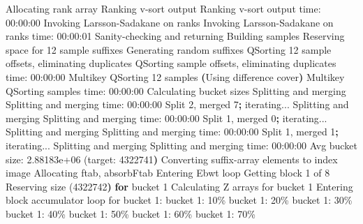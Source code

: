 \documentclass[
  letterpaper,
  DIV=11,
  numbers=noendperiod]{scrartcl}
\newenvironment{Shaded}{\begin{snugshade}}{\end{snugshade}}
\newcommand{\ControlFlowTok}[1]{\textcolor[rgb]{0.00,0.23,0.31}{\textbf{#1}}}
\newcommand{\ErrorTok}[1]{\textcolor[rgb]{0.68,0.00,0.00}{#1}}
\newcommand{\ExtensionTok}[1]{\textcolor[rgb]{0.00,0.23,0.31}{#1}}
\newcommand{\KeywordTok}[1]{\textcolor[rgb]{0.00,0.23,0.31}{\textbf{#1}}}
\newcommand{\NormalTok}[1]{\textcolor[rgb]{0.00,0.23,0.31}{#1}}
\begin{document}
\begin{Shaded}
\begin{Highlighting}[]
  \ExtensionTok{Allocating}\NormalTok{ rank array}
  \ExtensionTok{Ranking}\NormalTok{ v{-}sort output}
  \ExtensionTok{Ranking}\NormalTok{ v{-}sort output time: 00:00:00}
  \ExtensionTok{Invoking}\NormalTok{ Larsson{-}Sadakane on ranks}
  \ExtensionTok{Invoking}\NormalTok{ Larsson{-}Sadakane on ranks time: 00:00:01}
  \ExtensionTok{Sanity{-}checking}\NormalTok{ and returning}
\ExtensionTok{Building}\NormalTok{ samples}
\ExtensionTok{Reserving}\NormalTok{ space for 12 sample suffixes}
\ExtensionTok{Generating}\NormalTok{ random suffixes}
\ExtensionTok{QSorting}\NormalTok{ 12 sample offsets, eliminating duplicates}
\ExtensionTok{QSorting}\NormalTok{ sample offsets, eliminating duplicates time: 00:00:00}
\ExtensionTok{Multikey}\NormalTok{ QSorting 12 samples}
  \KeywordTok{(}\ExtensionTok{Using}\NormalTok{ difference cover}\KeywordTok{)}
  \ExtensionTok{Multikey}\NormalTok{ QSorting samples time: 00:00:00}
\ExtensionTok{Calculating}\NormalTok{ bucket sizes}
\ExtensionTok{Splitting}\NormalTok{ and merging}
  \ExtensionTok{Splitting}\NormalTok{ and merging time: 00:00:00}
\ExtensionTok{Split}\NormalTok{ 2, merged 7}\KeywordTok{;} \ExtensionTok{iterating...}
\ExtensionTok{Splitting}\NormalTok{ and merging}
  \ExtensionTok{Splitting}\NormalTok{ and merging time: 00:00:00}
\ExtensionTok{Split}\NormalTok{ 1, merged 0}\KeywordTok{;} \ExtensionTok{iterating...}
\ExtensionTok{Splitting}\NormalTok{ and merging}
  \ExtensionTok{Splitting}\NormalTok{ and merging time: 00:00:00}
\ExtensionTok{Split}\NormalTok{ 1, merged 1}\KeywordTok{;} \ExtensionTok{iterating...}
\ExtensionTok{Splitting}\NormalTok{ and merging}
  \ExtensionTok{Splitting}\NormalTok{ and merging time: 00:00:00}
\ExtensionTok{Avg}\NormalTok{ bucket size: 2.88183e+06 }\ErrorTok{(}\ExtensionTok{target:}\NormalTok{ 4322741}\KeywordTok{)}
\ExtensionTok{Converting}\NormalTok{ suffix{-}array elements to index image}
\ExtensionTok{Allocating}\NormalTok{ ftab, absorbFtab}
\ExtensionTok{Entering}\NormalTok{ Ebwt loop}
\ExtensionTok{Getting}\NormalTok{ block 1 of 8}
  \ExtensionTok{Reserving}\NormalTok{ size }\ErrorTok{(}\ExtensionTok{4322742}\KeywordTok{)} \ControlFlowTok{for}\NormalTok{ bucket }\ExtensionTok{1}
  \ExtensionTok{Calculating}\NormalTok{ Z arrays for bucket 1}
  \ExtensionTok{Entering}\NormalTok{ block accumulator loop for bucket 1:}
  \ExtensionTok{bucket}\NormalTok{ 1: 10\%}
  \ExtensionTok{bucket}\NormalTok{ 1: 20\%}
  \ExtensionTok{bucket}\NormalTok{ 1: 30\%}
  \ExtensionTok{bucket}\NormalTok{ 1: 40\%}
  \ExtensionTok{bucket}\NormalTok{ 1: 50\%}
  \ExtensionTok{bucket}\NormalTok{ 1: 60\%}
  \ExtensionTok{bucket}\NormalTok{ 1: 70\%}

\end{Highlighting}
\end{Shaded}
\end{document}
